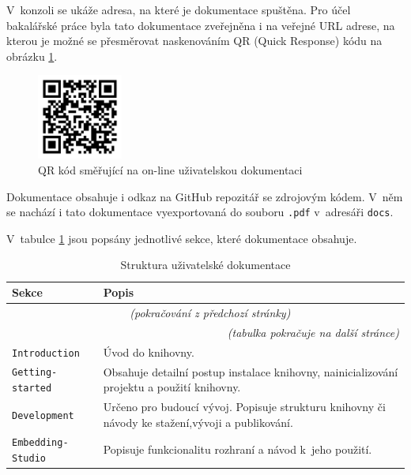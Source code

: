 \documentclass[czech, bc, kiv, he, iso690numb, viewonly]{fasthesis} %
\begin{document}
V~konzoli se ukáže adresa, na které je dokumentace spuštěna. Pro účel bakalářské práce byla tato dokumentace
zveřejněna i na veřejné URL adrese, na kterou je možné se přesměrovat naskenováním QR (Quick Response) kódu na obrázku \ref{fig:qrCode}.

\begin{figure}[h]
	\centering
	\includegraphics[width=0.25\textwidth]{pictures/QR.pdf}
	\caption{QR kód směřující na on-line uživatelskou dokumentaci}
	\label{fig:qrCode}
\end{figure}

Dokumentace obsahuje i odkaz na GitHub repozitář se zdrojovým kódem. V~něm se nachází i tato dokumentace vyexportovaná do souboru \texttt{.pdf} v~adresáři \texttt{docs}. 


V~tabulce \ref{tab:docsTabs} jsou popsány jednotlivé sekce, které dokumentace obsahuje.

	\begin{longtable}{p{}p{}}
	\caption{Struktura uživatelské dokumentace}
	\label{tab:docsTabs}\\
	\toprule[1.5pt]
	\textbf{Sekce} & \textbf{Popis}\\
	\midrule
	\endfirsthead
	\multicolumn{2}{c}{\tablename{}~\thetable{} \textit{(pokračování z předchozí stránky)}}\\
	\endhead
	\midrule
	\multicolumn{2}{r}{\textit{(tabulka pokračuje na další stránce)}}\\
	\endfoot
	\bottomrule[1.5pt]
	\endlastfoot
	\verb"Introduction" & Úvod do knihovny. \\
	\midrule
	\verb"Getting-started" & Obsahuje detailní postup instalace knihovny, nainicializování projektu a použití knihovny. \\
	\midrule
	\verb"Development" & Určeno pro budoucí vývoj. Popisuje strukturu knihovny či návody ke stažení,vývoji a publikování.\\
	\midrule
	\verb"Embedding-Studio" & Popisuje funkcionalitu rozhraní a návod k~jeho použití. \\
	\end{longtable}
\end{document}

